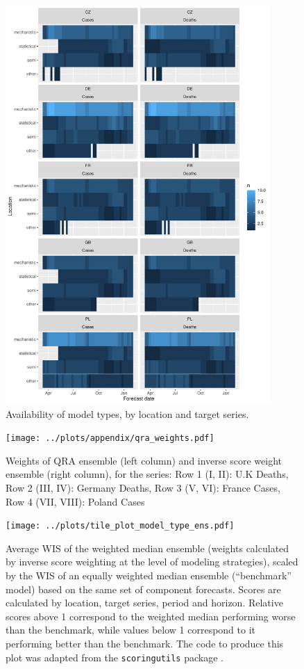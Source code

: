 \begin{figure}
\centering
\includegraphics[width = 0.9\textwidth]{../plots/model_type_per_loc.pdf}
\caption{Availability of model types, by location and target series.}
\label{fig:mt_avail}
\end{figure}

\begin{figure}
\centering
\texttt{[image: ../plots/appendix/qra\_weights.pdf]}
\caption{Weights of QRA ensemble (left column) and inverse score weight ensemble (right column), for the series:
Row 1 (I, II): U.K Deaths, Row 2 (III, IV): Germany Deaths, Row 3 (V, VI): France Cases, Row 4 (VII, VIII): Poland Cases}
\label{fig:qra weights}
\end{figure}

\begin{figure}
\centering
\texttt{[image: ../plots/tile\_plot\_model\_type\_ens.pdf]}
\caption{Average WIS of the weighted median ensemble (weights calculated by inverse score weighting at the level of modeling strategies), scaled by the WIS of an equally weighted median ensemble (``benchmark'' model) based on the same set of component forecasts. Scores are calculated by location, target series, period and horizon. Relative scores above 1 correspond to the weighted median performing worse than the benchmark, while values below 1 correspond to it performing better than the benchmark. The code to produce this plot was adapted from the \texttt{scoringutils} package \citep{bosse_evaluating_2022}.}
\label{fig:modeltype_tileplot_byhor}
\end{figure}

